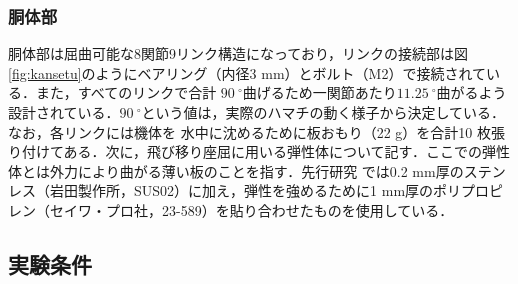 \subsubsection{胴体部}
胴体部は屈曲可能な8関節9リンク構造になっており，リンクの接続部は図\ref{fig:kansetu}のようにベアリング（内径3 mm）とボルト（M2）で接続されている．また，すべてのリンクで合計
$90\:^\circ$曲げるため一関節あたり$11.25\:^\circ$曲がるよう設計されている．$90\:^\circ$という値は，実際のハマチの動く様子から決定している．なお，各リンクには機体を
水中に沈めるために板おもり（22 g）を合計10 枚張り付けてある．次に，飛び移り座屈に用いる弾性体について記す．ここでの弾性体とは外力により曲がる薄い板のことを指す．先行研究
では0.2 mm厚のステンレス（岩田製作所，SUS02）に加え，弾性を強めるために1 mm厚のポリプロピレン（セイワ・プロ社，23-589）を貼り合わせたものを使用している．

\subsection{実験条件}


